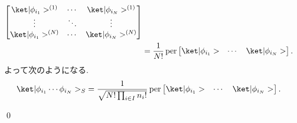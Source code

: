 \documentclass[uplatex,dvipdfmx,a4paper,11pt]{jlreq}
\makeatletter
\DeclareMathOperator{\per}{per}
\numberwithin{equation}{section}
\theoremstyle{definition}
\renewenvironment{proof}[1][\proofname]{\par
  \normalfont
  \topsep6\p@\@plus6\p@ \trivlist
  \item[\hskip\labelsep{\bfseries #1}\@addpunct{\bfseries}]\ignorespaces\quad\par
}{
  \qed\endtrivlist\@endpefalse
}
\renewcommand\proofname{証明}
\makeatother
\begin{document}
\begin{proof}
\begin{align}
\begin{bmatrix}
                                                                               \ket|\phi_{i_1}>^{(1)} & \cdots & \ket|\phi_{i_N}>^{(1)} \\
                                                                               \vdots                 & \ddots & \vdots                 \\
                                                                               \ket|\phi_{i_1}>^{(N)} & \cdots & \ket|\phi_{i_N}>^{(N)}
                                                                             \end{bmatrix}                                           \\
                                                         & = \frac{1}{N!}\per\begin{bmatrix}\ket|\phi_{i_1}> & \cdots & \ket|\phi_{i_N}>\end{bmatrix}.
  \end{align}
  よって次のようになる.
  \begin{align}
    \ket|\phi_{i_1}\cdots\phi_{i_N}>_S & = \frac{1}{\sqrt{N!\prod_{i\in I}n_i!}}\per\begin{bmatrix}\ket|\phi_{i_1}> & \cdots & \ket|\phi_{i_N}>\end{bmatrix}.
  \end{align}
\end{proof}
\end{document}
